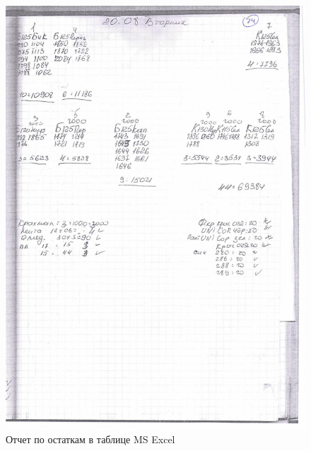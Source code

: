 \begin{figure}
\begin{center}
  \includegraphics[height=0.8\textheight, width=\textwidth, keepaspectratio]{Pics/d24.jpg}
\end{center}
  \caption{Отчет по остаткам в таблице MS Excel}
  \label{pic:d24}
\end{figure}

